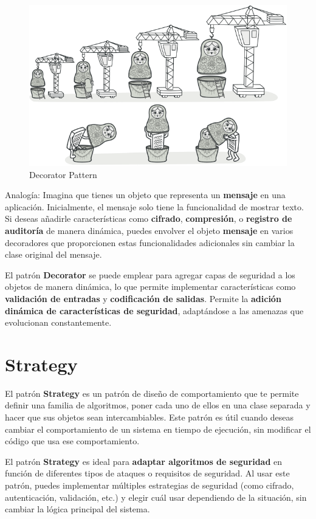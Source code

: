 \begin{figure}[H]
    \centering
    \includegraphics[width=0.5\linewidth]{PatronesSoftware/decorator.png}
    \caption{Decorator Pattern}
    \label{fig:decorator-pattern}
\end{figure}
Analogía: Imagina que tienes un objeto que representa un \textbf{mensaje} en una aplicación. Inicialmente, el mensaje solo tiene la funcionalidad de mostrar texto. Si deseas añadirle características como \textbf{cifrado}, \textbf{compresión}, o \textbf{registro de auditoría} de manera dinámica, puedes envolver el objeto \textbf{mensaje} en varios decoradores que proporcionen estas funcionalidades adicionales sin cambiar la clase original del mensaje. 

El patrón \textbf{Decorator} se puede emplear para agregar capas de seguridad a los objetos de manera dinámica, lo que permite implementar características como \textbf{validación de entradas} y \textbf{codificación de salidas}. Permite la \textbf{adición dinámica de características de seguridad}, adaptándose a las amenazas que evolucionan constantemente.

\section{Strategy}

El patrón \textbf{Strategy} es un patrón de diseño de comportamiento que te permite definir una familia de algoritmos, poner cada uno de ellos en una clase separada y hacer que sus objetos sean intercambiables. Este patrón es útil cuando deseas cambiar el comportamiento de un sistema en tiempo de ejecución, sin modificar el código que usa ese comportamiento.

El patrón \textbf{Strategy} es ideal para \textbf{adaptar algoritmos de seguridad} en función de diferentes tipos de ataques o requisitos de seguridad. Al usar este patrón, puedes implementar múltiples estrategias de seguridad (como cifrado, autenticación, validación, etc.) y elegir cuál usar dependiendo de la situación, sin cambiar la lógica principal del sistema.

